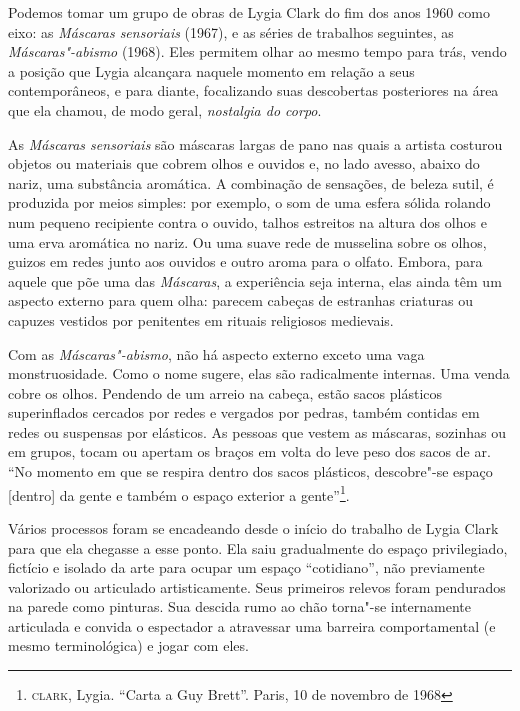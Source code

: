 \begin{multicols}{2}

\noindent{}Podemos tomar um grupo de obras de Lygia Clark do fim dos anos 1960 como eixo: as \textit{Máscaras sensoriais} (1967), e as séries de trabalhos seguintes, as \textit{Máscaras"-abismo} (1968). Eles permitem olhar ao mesmo tempo para trás, vendo a posição que Lygia alcançara naquele momento em relação a seus contemporâneos, e para diante, focalizando suas descobertas posteriores na área que ela chamou, de modo geral, \textit{nostalgia do corpo}.

As \textit{Máscaras sensoriais} são máscaras largas de pano nas quais a artista costurou objetos ou materiais que cobrem olhos e ouvidos e, no lado avesso, abaixo do nariz, uma substância aromática. A combinação de sensações, de beleza sutil, é produzida por meios simples: por exemplo, o som de uma esfera sólida rolando num pequeno recipiente contra o ouvido, talhos estreitos na altura dos olhos e uma erva aromática no nariz. Ou uma suave rede de musselina sobre os olhos, guizos em redes junto aos ouvidos e outro aroma para o olfato. Embora, para aquele que põe uma das \textit{Máscaras}, a experiência seja interna, elas ainda têm um aspecto externo para quem olha: parecem cabeças de estranhas criaturas ou capuzes vestidos por penitentes em rituais religiosos medievais. 

Com as \textit{Máscaras"-abismo}, não há aspecto externo exceto uma vaga monstruosidade. Como o nome sugere, elas são radicalmente internas. Uma venda cobre os olhos. Pendendo de um arreio na cabeça, estão sacos plásticos superinflados cercados por redes e vergados por pedras, também contidas em redes ou suspensas por elásticos. As pessoas que vestem as máscaras, sozinhas ou em grupos, tocam ou apertam os braços em volta do leve peso dos sacos de ar. ``No momento em que se respira dentro dos sacos plásticos, descobre"-se espaço {[}dentro{]} da gente e também o espaço exterior a gente''\footnote{\textsc{clark}, Lygia. ``Carta a Guy Brett''. Paris, 10 de novembro de 1968}.

Vários processos foram se encadeando desde o início do trabalho de Lygia
Clark para que ela chegasse a esse ponto. Ela saiu gradualmente do
espaço privilegiado, fictício e isolado da arte para ocupar um espaço
``cotidiano'', não previamente valorizado ou articulado artisticamente.
Seus primeiros relevos foram pendurados na parede como pinturas. Sua
descida rumo ao chão torna"-se internamente articulada e convida o
espectador a atravessar uma barreira comportamental (e mesmo
terminológica) e jogar com eles. 


\end{multicols}
